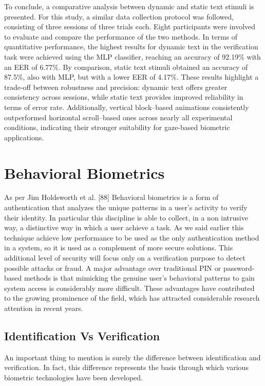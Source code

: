 \documentclass[12pt]{report}
\begin{document}
To conclude, a comparative analysis between dynamic and static text stimuli is presented.
For this study, a similar data collection protocol was followed, consisting of three sessions of three trials each.
Eight participants were involved to evaluate and compare the performance of the two methods.
In terms of quantitative performance, the highest results for dynamic text in the verification task were achieved using the MLP classifier, reaching an accuracy of 92.19\% with an EER of 6.77\%.
By comparison, static text stimuli obtained an accuracy of 87.5\%, also with MLP, but with a lower EER of 4.17\%.
These results highlight a trade-off between robustness and precision: dynamic text offers greater consistency across sessions, while static text provides improved reliability in terms of error rate.
Additionally, vertical block–based animations consistently outperformed horizontal scroll–based ones across nearly all experimental conditions, indicating their stronger suitability for gaze-based biometric applications.

\newpage

\chapter{Behavioral Biometrics}

\noindent
As per Jim Holdsworth et al. [88] Behavioral biometrics is a form of authentication that analyzes the unique patterns in a user's activity to verify their identity. 
In particular this discipline is able to collect, in a non intrusive way, a distinctive way in which a user achieve a task.
As we said earlier this technique achieve low performance to be used as the only authentication method in a system, so it is used as a complement of more secure solutions.
This additional level of security will focus only on a verification purpose to detect possible attacks or fraud.
A major advantage over traditional PIN or password-based methods is that mimicking the genuine user's behavioral patterns to gain system access is considerably more difficult.
These advantages have contributed to the growing prominence of the field, which has attracted considerable research attention in recent years.

\section{Identification Vs Verification}

An important thing to mention is surely the difference between identification and verification.
In fact, this difference represents the basis through which various biometric technologies have been developed.
\end{document}

